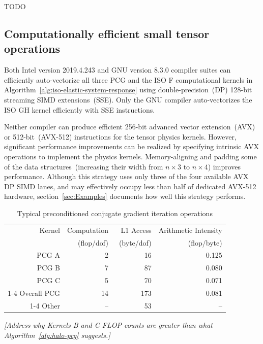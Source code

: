 \documentclass[]             %
{NASA}                       %
\begin{document}
TODO

\subsection{Computationally efficient small tensor operations}
\label{subsec:efficient-small-tensor-eval}

Both Intel version 2019.4.243 and GNU version 8.3.0 compiler suites can efficiently auto-vectorize all three PCG and the ISO F computational kernels in Algorithm~\ref{alg:iso-elastic-system-response} using double-precision~(DP) 128-bit streaming SIMD extensions~(SSE). Only the GNU compiler auto-vectorizes the ISO GH kernel efficiently with SSE instructions. 

Neither compiler can produce efficient 256-bit advanced vector extension~(AVX) or 512-bit~(AVX-512) instructions for the tensor physics kernels. However, significant performance improvements can be realized by specifying intrinsic AVX operations to implement the physics kernels. Memory-aligning and padding some of the data structures~(increasing their width from $n\times3$ to $n\times4$) improves performance. Although this strategy uses only three of the four available AVX DP SIMD lanes, and may effectively occupy less than half of dedicated AVX-512 hardware, section~\ref{sec:Examples} documents how well this strategy performs.

\begin{table}[ht]%
\caption{Typical preconditioned conjugate gradient iteration operations}
\label{tab:kern-pcg}
\begin{center}
\begin{tabular}{rrrr}
\toprule
Kernel & Computation & L1 Access & Arithmetic Intensity\\
&~(flop/dof) &~(byte/dof) &~(flop/byte)\\
\midrule
PCG A & 2 & 16 & 0.125\\
PCG B & 7 & 87 & 0.080\\
PCG C & 5 & 70 & 0.071\\
\cmidrule(lr){1-4}
Overall PCG & 14 & 173 & 0.081\\
\cmidrule(lr){1-4}
Other & – & 53 & –\\
\bottomrule
\end{tabular}
\end{center}
\end{table}

\emph{[Address why Kernels B and C FLOP counts are greater than what Algorithm~\ref{alg:halo-pcg} suggests.]}
\end{document}
